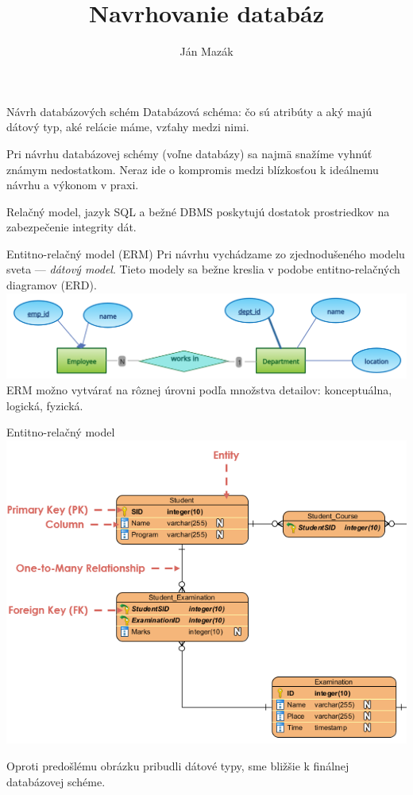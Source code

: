 \documentclass[12pt]{beamer}
\title{Navrhovanie databáz}
\author{Ján Mazák}
\institute{FMFI UK Bratislava}
\date{}
\begin{document}
\frame{\titlepage}

\begin{frame}[fragile]{Návrh databázových schém}
\alert{Databázová schéma}: čo sú atribúty a aký majú dátový typ, aké relácie máme, vzťahy medzi nimi.
\bigskip

Pri návrhu databázovej schémy (voľne databázy) sa najmä snažíme vyhnúť známym nedostatkom.
Neraz ide o kompromis medzi blízkosťou k ideálnemu návrhu a výkonom v praxi.
\bigskip

Relačný model, jazyk SQL a bežné DBMS poskytujú dostatok prostriedkov na zabezpečenie integrity dát.
\end{frame}

\begin{frame}[fragile]{Entitno-relačný model (ERM)}
Pri návrhu vychádzame zo zjednodušeného modelu sveta --- \emph{dátový model}.
Tieto modely sa bežne kreslia v podobe \alert{entitno-relačných diagramov} (ERD).
\\[5mm]

\includegraphics[scale=.17]{erd1.png}
\\[5mm]

ERM možno vytvárať na rôznej úrovni podľa množstva detailov: konceptuálna, logická, fyzická.
\end{frame}

\begin{frame}[fragile]{Entitno-relačný model}
\includegraphics[scale=.5]{erd2.png}

Oproti predošlému obrázku pribudli dátové typy, sme bližšie k finálnej databázovej schéme.
\end{frame}
\end{document}
